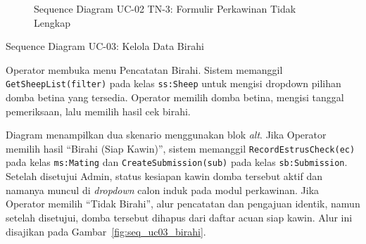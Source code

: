 \begin{figure}[htbp]
\centering
{}
\caption{Sequence Diagram UC-02 TN-3: Formulir Perkawinan Tidak Lengkap}
\label{fig:seq_uc02_tn3_validasi}
\end{figure}

\newpage


\item{Sequence Diagram UC-03: Kelola Data Birahi}

Operator membuka menu Pencatatan Birahi. Sistem memanggil
\texttt{GetSheepList(filter)} pada kelas \texttt{ss:Sheep} untuk mengisi
dropdown pilihan domba betina yang tersedia. Operator memilih domba
betina, mengisi tanggal pemeriksaan, lalu memilih hasil cek birahi.

Diagram menampilkan dua skenario menggunakan blok \textit{alt}. Jika
Operator memilih hasil ``Birahi (Siap Kawin)'', sistem memanggil
\texttt{RecordEstrusCheck(ec)} pada kelas \texttt{ms:Mating} dan
\texttt{CreateSubmission(sub)} pada kelas \texttt{sb:Submission}. Setelah
disetujui Admin, status kesiapan kawin domba tersebut aktif dan namanya
muncul di \textit{dropdown} calon induk pada modul perkawinan. Jika
Operator memilih ``Tidak Birahi'', alur pencatatan dan pengajuan identik,
namun setelah disetujui, domba tersebut dihapus dari daftar acuan siap
kawin. Alur ini disajikan pada Gambar~\ref{fig:seq_uc03_birahi}.


